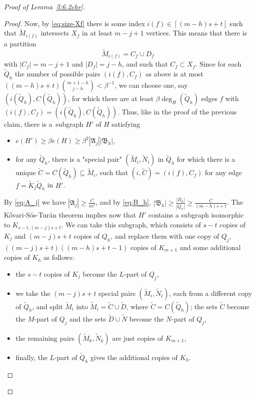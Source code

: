 \documentclass[reqno, 12pt]{amsart}
\numberwithin{equation}{section}
\numberwithin{figure}{section}
\theoremstyle{plain}
\theoremstyle{definition}
\def\fA{\mathfrak{A}}
\def\fB{\mathfrak{B}}
\begin{document}
\begin{proof}[Proof of Lemma~\ref{l:6.2chr}]
\begin{proof}
            Now, by \eqref{eq:size-Xf} there is some index $i(f)\in [(m-h)s+t]$ such that $\tilde M_{i(f)}$ intersects $X_f$ in at least $m-j+1$ vertices. This means that there is a partition 
            \[\tilde M_{i(f)}=C_f\cup D_f\]
            with $|C_f|=m-j+1$ and $|D_f|=j-h$, and such that $C_f\subset X_f$. Since for each $\tilde Q_h$ the number of possible pairs $(i(f), C_f)$ as above is at most $((m-h)s+t){m+1-h\choose j-h} < \beta^{-1}$, we can choose one, say $(i(\tilde Q_h), C(\tilde Q_h))$, for which there are at least $\beta \deg_H(\tilde Q_h)$ edges $f$ with $(i(f), C_f) = (i(\tilde Q_h),C(\tilde Q_h))$.
            Thus, like in the proof of the previous claim, there is a~subgraph $H'$ of $H$ satisfying
            \begin{itemize}
                \item $e(H')\geq \beta e(H) \geq  \beta ^2 |\fA_j| |\fB_h|$,
                \item for any $\tilde Q_h$, there is a "special pair" $(\tilde M_i, \tilde N_i)$ in $\tilde Q_h$ for which there is a unique $\tilde C=C(\tilde Q_h)\subseteq \tilde M_i$, such that $(i,\tilde C)=(i(f),C_f)$ for any edge $f=\tilde K_j \tilde Q_h$ in $H'$. 
            \end{itemize}

            
            By \eqref{eq:A_j} we have $|\fA_j|\geq \frac{C}{m^2}$, and by \eqref{eq:B_h}, $|\fB_h|\geq \frac{|B_h|}{|Q_h|}\geq\frac{C}{(m-h)s+t}$. The K\H{o}vari-S\'os-Tur\'an theorem implies now that $H'$ contains a subgraph isomorphic to $K_{s-t,(m-j)s+t}$. 
            We can take this subgraph, which consists of $s-t$ copies of $K_j$ and $(m-j)s+t$ copies of $Q_h$, and replace them with one copy of $Q_j$, $((m-j)s+t)((m-h)s+t-1)$ copies of $K_{m+1}$ and some additional copies of $K_h$ as follows:
            \begin{itemize}
                \item the $s-t$ copies of $K_j$ become the $L$-part of $Q_j$,
                \item we take the $(m-j)s+t$ special pairs $(\tilde M_i, \tilde N_i)$, each from a different copy of $\tilde Q_h$, and split $\tilde M_i$ into $\tilde M_i = \tilde C \cup \tilde D$, where $\tilde C = C(\tilde Q_h)$; the sets $\tilde C$ become the $M$-part of $Q_j$ and the sets $\tilde D \cup \tilde N$ become the $N$-part of $Q_j$, 
                
                \item the remaining pairs $(\tilde M_k, \tilde N_k)$ are just copies of $K_{m+1}$, 
                \item finally, the $L$-part of $\tilde Q_h$ gives the additional copies of $K_h$.
            \end{itemize} 
            

\end{proof}
\end{proof}
\end{document}
